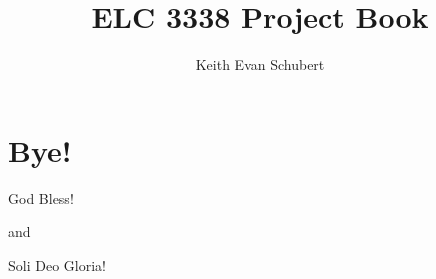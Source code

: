 \documentclass[openany]{book}
\title{ELC 3338 Project Book}
\author{Keith Evan Schubert}
\begin{document}
\maketitle
\tableofcontents








%
%

\chapter{Bye!}

\vspace{.1in}

\begin{center}
{\Huge{God Bless!}}
\end{center}

\vspace{.1in}

\begin{center}
{and}
\end{center}

\vspace{.1in}

\begin{center}
{\Huge{Soli Deo Gloria!}}
\end{center}


%
%
\end{document}

